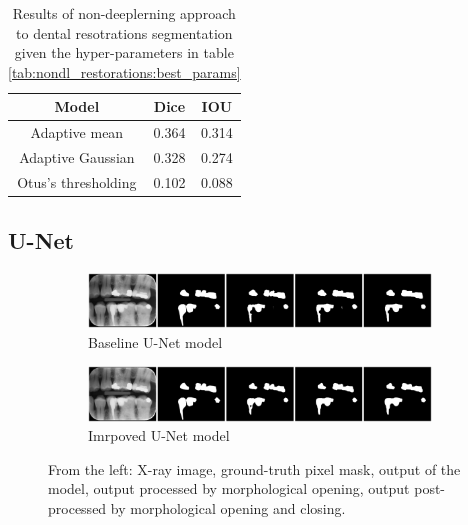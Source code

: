 \begin{table}[H]
    \centering
    \begin{tabular}{|c|c|c|}
        \hline
        Model               & Dice  & IOU   \\ \hline
        Adaptive mean       & 0.364 & 0.314 \\ \hline
        Adaptive Gaussian   & 0.328 & 0.274 \\ \hline
        Otus's thresholding & 0.102 & 0.088 \\ \hline
    \end{tabular}
    \caption{Results of non-deeplerning approach to dental resotrations segmentation given the hyper-parameters in table \ref{tab:nondl_restorations:best_params}}
    \label{tab:nondl_results}
\end{table}



\subsection{U-Net}

\begin{figure}[H]
    \centering
    \begin{subfigure}[b]{\textwidth}
        \includegraphics[width=1\linewidth]{images/unet_1_img_12.pdf}
        \caption{Baseline U-Net model}
    \end{subfigure}

    \begin{subfigure}[b]{\textwidth}
        \includegraphics[width=1\linewidth]{images/unet_2_img_12.pdf}
        \caption{Imrpoved U-Net model}
    \end{subfigure}
    \caption{From the left: X-ray image, ground-truth pixel mask, output of the model, output processed by morphological opening, output post-processed by morphological opening and closing.}
\end{figure}

